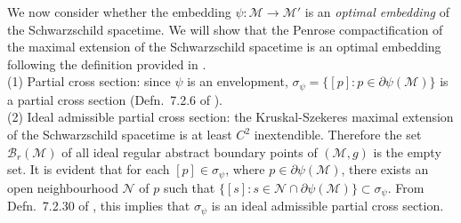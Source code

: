 \documentclass[pdflatex,sn-mathphys-num]{sn-jnl}
\newtheorem{prop}[theorem]{Proposition}
\theoremstyle{definition}
\begin{document}

    

We now consider whether the embedding $\psi:\mathcal{M} \rightarrow \mathcal{M}'$ is an {\it optimal embedding} of the Schwarzschild spacetime. We will show that the Penrose compactification of the maximal extension of the Schwarzschild spacetime is an optimal embedding following the definition provided in \cite{Barrythesis_2014}.\\

(1) Partial cross section: since $\psi$ is an envelopment, $\sigma_{\psi} = \{[p]: p \in \partial\psi(\mathcal{M})\}$ is a partial cross section (Defn.\ 7.2.6 of \cite{Barrythesis_2014}). \\

(2) Ideal admissible partial cross section: the Kruskal-Szekeres maximal extension of the Schwarzschild spacetime is at least $C^2$ inextendible. Therefore the set $\mathcal{B}_r(\mathcal{M})$ of all ideal regular abstract boundary points of $(\mathcal{M},g)$ is the empty set. It is evident that for each $[p] \in \sigma_{\psi}$, where $p \in \partial\psi(\mathcal{M})$, there exists an open neighbourhood $\mathcal{N}$ of $p$ such that $\{[s]:s \in \mathcal{N} \cap \partial\psi(\mathcal{M})\} \subset \sigma_{\psi}$. From Defn.\ 7.2.30 of \cite{Barrythesis_2014}, this implies that $\sigma_{\psi}$ is an ideal admissible partial cross section.\\
\end{document}
